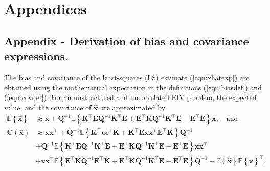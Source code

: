 \glsresetall

\chapter{Appendices }\label{chap:Appendices}
\vfill{} 


\section{Appendix - Derivation of bias and covariance expressions.  \label{appendix:biascovSEIV} }

The bias and covariance of the least-squares (LS) estimate (\ref{eqn:xhatexp}) are obtained using the mathematical expectation in the definitions (\ref{eqn:biasdef}) and (\ref{eqn:covdef}).
For an unstructured and uncorrelated EIV problem, the expected value, and the covariance of $\widehat{\mathbf{x}}$ are approximated by
\begin{equation} \begin{aligned} \mathbb{E} \left\{ \widehat{\mathbf{x}} \right\} & \approx \mathbf{x}  + \mathbf{Q}^{-1} \mathbb{E} \left\{ \mathbf{K}^\top \mathbf{E} \mathbf{Q}^{-1} \mathbf{K}^\top \mathbf{E} + \mathbf{E}^\top \mathbf{K} \mathbf{Q}^{-1} \mathbf{K}^\top \mathbf{E} - \mathbf{E}^\top \mathbf{E}  \right\} \mathbf{x}, \quad \text{and}  \\ 
\mathbf{C} \left( \widehat{\mathbf{x}} \right)  & \approx \mathbf{x} \mathbf{x}^\top + \mathbf{Q}^{-1} \mathbb{E} \left\{ \mathbf{K}^\top \bm{\epsilon} \bm{\epsilon}^\top \mathbf{K} + \mathbf{K}^\top \mathbf{E} \mathbf{x} \mathbf{x}^\top \mathbf{E}^\top \mathbf{K} \right\} \mathbf{Q}^{-1} \\ 
& + \mathbf{Q}^{-1} \mathbb{E} \left\{ \mathbf{K}^\top \mathbf{E} \mathbf{Q}^{-1} \mathbf{K}^\top \mathbf{E} + \mathbf{E}^\top \mathbf{K} \mathbf{Q}^{-1} \mathbf{K}^\top \mathbf{E} - \mathbf{E}^\top \mathbf{E} \right\} \mathbf{x} \mathbf{x}^\top \\
& + \mathbf{x} \mathbf{x}^\top \mathbb{E} \left\{ \mathbf{E}^\top \mathbf{K} \mathbf{Q}^{-1} \mathbf{E}^\top \mathbf{K} + \mathbf{E}^\top \mathbf{K} \mathbf{Q}^{-1} \mathbf{K}^\top \mathbf{E} - \mathbf{E}^\top \mathbf{E} \right\} \mathbf{Q}^{-1} - \mathbb{E} \left\{ \widehat{\mathbf{x}} \right\} \mathbb{E} \left\{ \widehat{\mathbf{x}} \right\}^\top , \label{eqn:EC_Eu} \end{aligned} \end{equation} 
